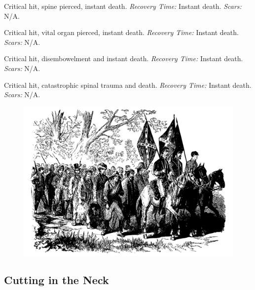\documentclass[12pt]{book}  %
\begin{document}
\begin{description}[labelwidth=1.5em, leftmargin=*, itemsep=0.4em]
    \item[17 -] Critical hit, spine pierced, instant death. \textit{Recovery Time:} Instant death. \textit{Scars:} N/A.
    \item[18 -] Critical hit, vital organ pierced, instant death. \textit{Recovery Time:} Instant death. \textit{Scars:} N/A.
    \item[19 -] Critical hit, disembowelment and instant death. \textit{Recovery Time:} Instant death. \textit{Scars:} N/A.
    \item[20 -] Critical hit, catastrophic spinal trauma and death. \textit{Recovery Time:} Instant death. \textit{Scars:} N/A.
\end{description}

\begin{figure}[h]
    \centering
    \includegraphics[width=\textwidth]{./images/combat08.pdf}
\end{figure}

\subsection{Cutting in the Neck}
\end{document}
